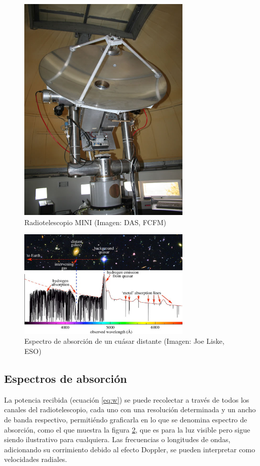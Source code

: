 \begin{figure}[p]
	\centering
	\includegraphics[width=3.25in]{mini.jpg}
	\caption{Radiotelescopio MINI (Imagen: DAS, FCFM)}
	\label{fig:mini}
\end{figure}

\begin{figure}[p]
	\centering
	\includegraphics[width=3.25in]{spectrum.jpg}
	\caption{Espectro de absorción de un cuásar distante (Imagen: Joe Liske, ESO)}
	\label{fig:spectrum}
\end{figure}

\subsection{Espectros de absorción}

La potencia recibida (ecuación \ref{eq:w}) se puede recolectar a través de todos los canales del radiotelescopio, cada uno con una resolución determinada y un ancho de banda respectivo, permitiéndo graficarla en lo que se denomina espectro de absorción, como el que muestra la figura \ref{fig:spectrum}, que es para la luz visible pero sigue siendo ilustrativo para cualquiera. Las frecuencias o longitudes de ondas, adicionando su corrimiento debido al efecto Doppler, se pueden interpretar como velocidades radiales.

